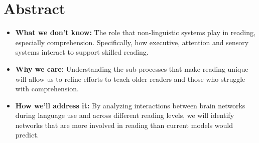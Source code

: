 \chapter{Abstract}

\begin{itemize}
	\item \textbf{What we don't know:} The role that non-linguistic systems play in reading, especially comprehension. Specifically, how executive, attention and sensory systems interact to support skilled reading.
	\item \textbf{Why we care:} Understanding the sub-processes that make reading unique will allow us to refine efforts to teach older readers and those who struggle with comprehension.
	\item \textbf{How we'll address it:} By analyzing interactions between brain networks during language use and across different reading levels, we will identify networks that are more involved in reading than current models would predict. 
\end{itemize}

